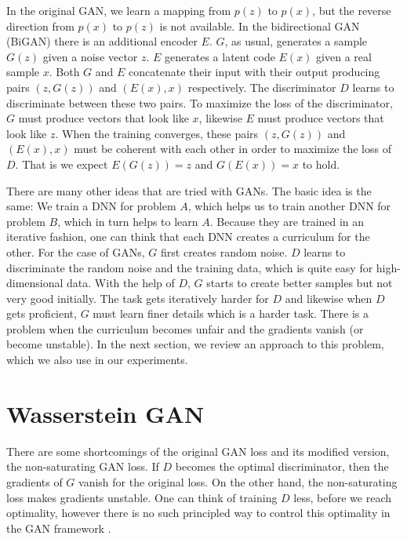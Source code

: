 \documentclass[a4paper,onesided,12pt]{report}
\begin{document}
In the original GAN, we learn a mapping from $p(z)$ to $p(x)$, but the reverse direction from $p(x)$ to $p(z)$ is not available. In the bidirectional GAN (BiGAN) \cite{donahue2016adversarial,dumoulin2016adversarially} there is an additional encoder $E$. $G$, as usual, generates a sample $G(z)$ given a noise vector $z$. $E$ generates a latent code $E(x)$ given a real sample $x$. Both $G$ and $E$ concatenate their input with their output producing pairs $(z, G(z))$ and $(E(x), x)$ respectively. The discriminator $D$ learns to discriminate between these two pairs. To maximize the loss of the discriminator, $G$ must produce vectors that look like $x$, likewise $E$ must produce vectors that look like $z$. When the training converges, these pairs $(z, G(z))$ and $(E(x), x)$ must be coherent with each other in order to maximize the loss of $D$. That is we expect $E(G(z))=z$  and $G(E(x))=x$ to hold.

There are many other ideas that are tried with GANs. The basic idea is the same: We train a DNN for problem $A$, which helps us to train another DNN for problem $B$, which in turn helps to learn $A$. Because they are trained in an iterative fashion, one can think that each DNN creates a curriculum for the other. For the case of GANs, $G$ first creates random noise. $D$ learns to discriminate the random noise and the training data, which is quite easy for high-dimensional data. With the help of $D$, $G$ starts to create better samples but not very good initially. The task gets iteratively harder for $D$ and likewise when $D$ gets proficient, $G$ must learn finer details which is a harder task. There is a problem when the curriculum becomes unfair and the gradients vanish (or become unstable). In the next section, we review an approach to this problem, which we also use in our experiments.

\section{Wasserstein GAN}
\label{sec:wgan}
There are some shortcomings of the original GAN loss and its modified version, the non-saturating GAN loss. If $D$ becomes the optimal discriminator, then the gradients of $G$ vanish for the original loss. On the other hand, the non-saturating loss makes gradients unstable. One can think of training $D$ less, before we reach optimality, however there is no such principled way to control this optimality in the GAN framework \cite{arjovsky2017towards}.
\end{document}

